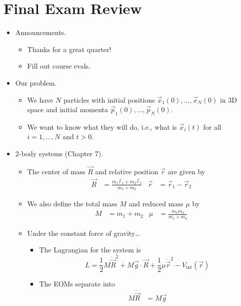 \documentclass[../notes.tex]{subfiles}
\begin{document}
\section{Final Exam Review}
\begin{itemize}
    \item {}Announcements.
    \begin{itemize}
        \item Thanks for a great quarter!
        \item Fill out course evals.
    \end{itemize}
    \item Our problem.
    \begin{itemize}
        \item We have $N$ particles with initial positions $\vec{x}_1(0),\dots,\vec{x}_N(0)$ in 3D space and initial momenta $\vec{p}_1(0),\dots,\vec{p}_N(0)$.
        \item We want to know what they will do, i.e., what is $\vec{x}_i(t)$ for all $i=1,\dots,N$ and $t>0$.
    \end{itemize}
    \item 2-body systems (Chapter 7).
    \begin{itemize}
        \item The center of mass $\vec{R}$ and relative position $\vec{r}$ are given by
        \begin{align*}
            \vec{R} &= \frac{m_1\vec{r}_1+m_2\vec{r}_2}{m_1+m_2}&
            \vec{r} &= \vec{r}_1-\vec{r}_2
        \end{align*}
        \item We also define the total mass $M$ and reduced mass $\mu$ by
        \begin{align*}
            M &= m_1+m_2&
            \mu &= \frac{m_1m_2}{m_1+m_2}
        \end{align*}
        \item Under the constant force of gravity\dots
        \begin{itemize}
            \item The Lagrangian for the system is
            \begin{equation*}
                L = \frac{1}{2}M\dot{\vec{R}}^2+M\vec{g}\cdot\vec{R}+\frac{1}{2}\mu\dot{\vec{r}}^2-V_\text{int}(\vec{r})
            \end{equation*}
            \item The EOMs separate into
            \begin{align*}
                M\ddot{\vec{R}} &= M\vec{g}\\

\end{align*}
\end{itemize}
\end{itemize}
\end{itemize}
\end{document}
